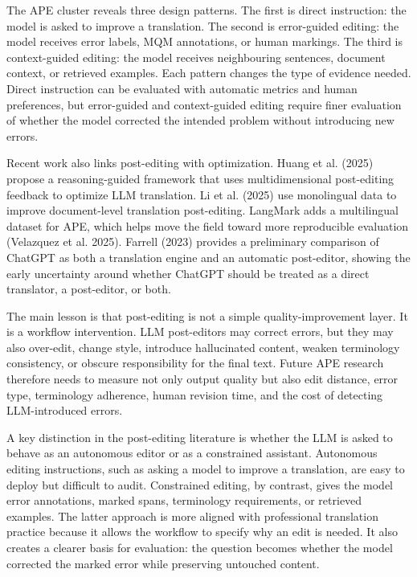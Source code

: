 \documentclass[11pt]{article}
\begin{document}
The APE cluster reveals three design patterns. The first is direct instruction: the model is asked to improve a translation. The second is error-guided editing: the model receives error labels, MQM annotations, or human markings. The third is context-guided editing: the model receives neighbouring sentences, document context, or retrieved examples. Each pattern changes the type of evidence needed. Direct instruction can be evaluated with automatic metrics and human preferences, but error-guided and context-guided editing require finer evaluation of whether the model corrected the intended problem without introducing new errors.

Recent work also links post-editing with optimization. Huang et al. (2025) propose a reasoning-guided framework that uses multidimensional post-editing feedback to optimize LLM translation. Li et al. (2025) use monolingual data to improve document-level translation post-editing. LangMark adds a multilingual dataset for APE, which helps move the field toward more reproducible evaluation (Velazquez et al. 2025). Farrell (2023) provides a preliminary comparison of ChatGPT as both a translation engine and an automatic post-editor, showing the early uncertainty around whether ChatGPT should be treated as a direct translator, a post-editor, or both.

The main lesson is that post-editing is not a simple quality-improvement layer. It is a workflow intervention. LLM post-editors may correct errors, but they may also over-edit, change style, introduce hallucinated content, weaken terminology consistency, or obscure responsibility for the final text. Future APE research therefore needs to measure not only output quality but also edit distance, error type, terminology adherence, human revision time, and the cost of detecting LLM-introduced errors.


A key distinction in the post-editing literature is whether the LLM is asked to behave as an autonomous editor or as a constrained assistant. Autonomous editing instructions, such as asking a model to improve a translation, are easy to deploy but difficult to audit. Constrained editing, by contrast, gives the model error annotations, marked spans, terminology requirements, or retrieved examples. The latter approach is more aligned with professional translation practice because it allows the workflow to specify why an edit is needed. It also creates a clearer basis for evaluation: the question becomes whether the model corrected the marked error while preserving untouched content.
\end{document}

